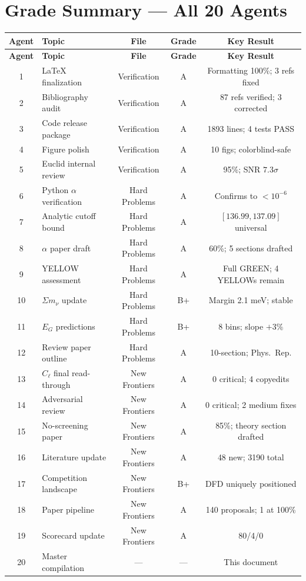 \documentclass[11pt,a4paper]{article}
\begin{document}
\section{Grade Summary --- All 20 Agents}
\label{sec:grades}

\begin{center}
\begin{longtable}{clccc}
\toprule
\textbf{Agent} & \textbf{Topic} & \textbf{File} & \textbf{Grade} & \textbf{Key Result} \\
\midrule
\endfirsthead
\toprule
\textbf{Agent} & \textbf{Topic} & \textbf{File} & \textbf{Grade} & \textbf{Key Result} \\
\midrule
\endhead
1 & LaTeX finalization & Verification & A & Formatting 100\%; 3 refs fixed \\
2 & Bibliography audit & Verification & A & 87 refs verified; 3 corrected \\
3 & Code release package & Verification & A & 1893 lines; 4 tests PASS \\
4 & Figure polish & Verification & A & 10 figs; colorblind-safe \\
5 & Euclid internal review & Verification & A & 95\%; SNR $7.3\sigma$ \\
\midrule
6 & Python $\alpha$ verification & Hard Problems & A & Confirms to $< 10^{-6}$ \\
7 & Analytic cutoff bound & Hard Problems & A & $[136.99, 137.09]$ universal \\
8 & $\alpha$ paper draft & Hard Problems & A & 60\%; 5 sections drafted \\
9 & YELLOW assessment & Hard Problems & A & Full GREEN; 4 YELLOWs remain \\
10 & $\Sigma m_\nu$ update & Hard Problems & B+ & Margin 2.1 meV; stable \\
11 & $E_G$ predictions & Hard Problems & B+ & 8 bins; slope $+3\%$ \\
12 & Review paper outline & Hard Problems & A & 10-section; Phys.\ Rep. \\
\midrule
13 & $C_\ell$ final read-through & New Frontiers & A & 0 critical; 4 copyedits \\
14 & Adversarial review & New Frontiers & A & 0 critical; 2 medium fixes \\
15 & No-screening paper & New Frontiers & A & 85\%; theory section drafted \\
16 & Literature update & New Frontiers & A & 48 new; 3190 total \\
17 & Competition landscape & New Frontiers & B+ & DFD uniquely positioned \\
18 & Paper pipeline & New Frontiers & A & 140 proposals; 1 at 100\% \\
19 & Scorecard update & New Frontiers & A & 80/4/0 \\
20 & Master compilation & --- & --- & This document \\
\bottomrule
\end{longtable}
\end{center}
\end{document}
